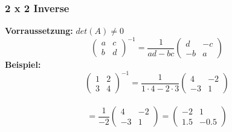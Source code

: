 \documentclass[12pt,a4paper]{article}
\begin{document}
\subsubsection{2 x 2 Inverse}
\textbf{Vorraussetzung:} $det(A) \neq 0$
\[
\begin{pmatrix}
    a & c \\
    b & d
\end{pmatrix}^{-1}
=
\frac{1}{ad - bc}
\begin{pmatrix}
    d & -c \\
    -b & a
\end{pmatrix}
\]
\textbf{Beispiel:}
\[
\begin{pmatrix}
    1 & 2 \\
    3 & 4
\end{pmatrix}^{-1}
=
\frac{1}{1 \cdot 4 - 2 \cdot 3}
\begin{pmatrix}
    4 & -2 \\
    -3 & 1
\end{pmatrix}
\]
\\
\[
=
\frac{1}{-2}
\begin{pmatrix}
    4 & -2 \\
    -3 & 1
\end{pmatrix}
=
\begin{pmatrix}
    -2 & 1 \\
    1.5 & -0.5
\end{pmatrix}
\]
\end{document}
